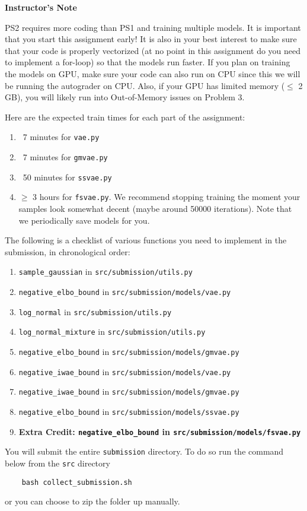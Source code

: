 \textbf{Instructor's Note}

PS2 requires more coding than PS1 and training multiple models. It is important that you
start this assignment early! It is also in your best interest to make sure that your code 
is properly vectorized (at no point in this assignment do you need to implement a for-loop) 
so that the models run faster. If you plan on training the models on GPU, make sure your 
code can also run on CPU since this we will be running the autograder on CPU. 
Also, if your GPU has limited memory ($\le$ 2 GB), you will likely run into Out-of-Memory issues on Problem 3.

Here are the expected train times for each part of the assignment:
\begin{enumerate}
    \item ~7 minutes for \texttt{vae.py}
    \item ~7 minutes for \texttt{gmvae.py}
    \item ~50 minutes for \texttt{ssvae.py}
    \item $\ge$ 3 hours for \texttt{fsvae.py}. We recommend stopping training the moment your samples
    look somewhat decent (maybe around 50000 iterations). Note that we periodically
    save models for you.
\end{enumerate}

The following is a checklist of various functions you need to implement in the
submission, in chronological order:

\begin{enumerate}
    \item \texttt{sample\_gaussian} in \texttt{src/submission/utils.py}
    \item \texttt{negative\_elbo\_bound} in \texttt{src/submission/models/vae.py}
    \item \texttt{log\_normal} in \texttt{src/submission/utils.py}
    \item \texttt{log\_normal\_mixture} in \texttt{src/submission/utils.py}
    \item \texttt{negative\_elbo\_bound} in \texttt{src/submission/models/gmvae.py}
    \item \texttt{negative\_iwae\_bound} in \texttt{src/submission/models/vae.py}
    \item \texttt{negative\_iwae\_bound} in \texttt{src/submission/models/gmvae.py}
    \item \texttt{negative\_elbo\_bound} in \texttt{src/submission/models/ssvae.py}
    \item \bf{Extra Credit}: \texttt{negative\_elbo\_bound} in \texttt{src/submission/models/fsvae.py}
\end{enumerate}

You will submit the entire \texttt{submission} directory. To do so run the command  below from the \texttt{src} directory
\begin{verbatim}
    bash collect_submission.sh
\end{verbatim}

or you can choose to zip the folder up manually.
